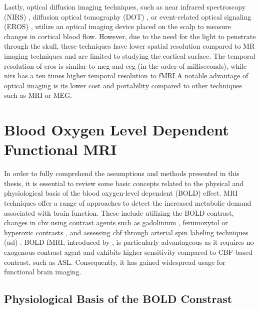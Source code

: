 Lastly, optical diffusion imaging techniques, such as near infrared spectroscopy
(NIRS)
\citep{Kleinschmidt1996SimultaneousRecordingCerebral,Villringer1993infraredspectroscopyNIRS},
diffusion optical tomography (DOT) \citep{White2010Quantitativeevaluationhigh},
or event-related optical signaling (EROS)
\citep{Gratton2001eventrelatedoptical,Gratton1997FastLocalizedEvent}, utilize an
optical imaging device placed on the scalp to measure changes in cortical blood
flow. However, due to the need for the light to penetrate through the skull,
these techniques have lower spatial resolution compared to MR imaging techniques
and are limited to studying the cortical surface. The temporal resolution of
\acrshort*{eros} is similar to \acrshort*{meg} and \acrshort*{eeg} (in the order
of milliseconds), while \acrshort*{nirs} has a ten times higher temporal
resolution to fMRI.A notable advantage of optical imaging is its lower cost and
portability compared to other techniques such as MRI or MEG.

\section{Blood Oxygen Level Dependent Functional MRI}

In order to fully comprehend the assumptions and methods presented in this
thesis, it is essential to review some basic concepts related to the physical
and physiological basis of the blood oxygen-level dependent (BOLD) effect. MRI
techniques offer a range of approaches to detect the increased metabolic demand
associated with brain function. These include utilizing the BOLD contrast,
changes in \acrshort*{cbv} using contrast agents such as gadolinium
\citep{Dean1992CerebralHA}, ferumoxytol
\citep{Christen2012Highresolutioncerebral} or hyperoxic contrasts
\citep{Bulte2007Measurementcerebralblood}, and assessing \acrshort*{cbf} through
arterial spin labeling techniques (\acrshort*{asl})
\citep{Buxton2009IntroductionFunctionalMagnetic}. BOLD fMRI, introduced by
\cite{Ogawa1990Brainmagneticresonance,Ogawa1992Intrinsicsignalchanges}, is
particularly advantageous as it requires no exogenous contrast agent and
exhibits higher sensitivity compared to CBF-based contrast, such as ASL.
Consequently, it has gained widespread usage for functional brain imaging.

\subsection{Physiological Basis of the BOLD Constrast}

